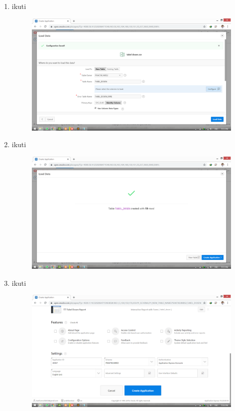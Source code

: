 \documentclass[11pt]{article}
\begin{document}
\begin{enumerate}
\item ikuti
\begin{figure}
        \centerline{\includegraphics[scale=0.1]{img/8LoadDataTabel.png}}
        \caption{}
		\label{langkah9}
\end{figure}

\item ikuti
\begin{figure}
        \centerline{\includegraphics[scale=0.1]{img/9CreateTabel.png}}
        \caption{}
		\label{langkah10}
\end{figure}

\item ikuti
\begin{figure}
        \centerline{\includegraphics[scale=0.1]{img/10CreateTabel2.png}}
        \caption{}
		\label{langkah11}
\end{figure}


\end{enumerate}
\end{document}

